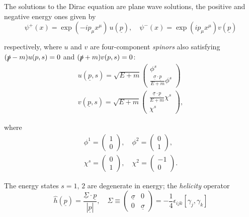 \documentclass{article}
\numberwithin{equation}{section}
\begin{document}
The solutions to the Dirac equation are plane wave solutions, the positive and negative energy ones given by
\begin{equation}
    \psi^+(x) = \exp(-ip_\mu x^\mu)\,u(\underline{p}), \quad \psi^-(x) = \exp(ip_\mu x^\mu) v(\underline{p})
\end{equation}

respectively, where $u$ and $v$ are four-component \textit{spinors} also satisfying $(\slashed{p}-m)u(p, s) = 0$ and $(\slashed{p} + m)v(p, s) = 0$:
\begin{gather}
    u(\underline{p}, s) = \sqrt{E+m} \begin{pmatrix}
        \phi^s \\ \frac{\underline{\sigma} \cdot \underline{p}}{E+m} \phi^s
    \end{pmatrix} \\
    v(\underline{p}, s) = \sqrt{E+m} \begin{pmatrix}
        \frac{\underline{\sigma} \cdot \underline{p}}{E+m} \chi^s \\ \chi^s
    \end{pmatrix},
\end{gather}

where 
\begin{gather}
    \phi^1 = \begin{pmatrix}
        1 \\ 0
    \end{pmatrix}, \quad \phi^2 = \begin{pmatrix}
        0 \\ 1
    \end{pmatrix}, \\
    \chi^s = \begin{pmatrix}
        0 \\ 1
    \end{pmatrix}, \quad \chi^2 = \begin{pmatrix}
        -1 \\ 0
    \end{pmatrix}.
\end{gather}

The energy states $s=1,\, 2$ are degenerate in energy; the \textit{helicity} operator
\begin{equation}
    \hat{h}(\underline{p}) = \frac{\underline{\Sigma} \cdot \underline{p}}{|\underline{p}|}, \quad \Sigma \equiv \begin{pmatrix}
        \underline{\sigma} & 0 \\ 0 & \underline{\sigma}
    \end{pmatrix} = -\frac{1}{4} \epsilon_{ij k} [\gamma_j, \gamma_k]
\end{equation}
\end{document}
